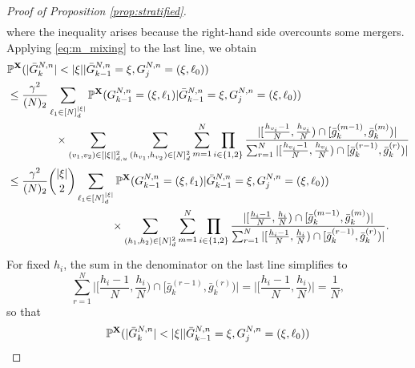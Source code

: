 \documentclass[a4paper,11pt]{article}
\theoremstyle{definition}
\newcommand{\bbP}{\mathbb{P}}
\newcommand{\bfX}{\mathbf{X}}
\begin{document}
\begin{proof}[Proof of Proposition \ref{prop:stratified}]
\begin{align*}
\end{align*}
where the inequality arises because the right-hand side overcounts some mergers.
Applying \eqref{eq:m_mixing} to the last line, we obtain
\begin{align}
&\bbP^{ \bfX }( | \bar{ G }_k^{ N, n } | < | \xi | | \bar{ G }_{ k - 1 }^{ N, n } = \xi, G_j^{ N, n } = ( \xi, \ell_0 ) ) \notag \\
&\leq \frac{ \gamma^2 }{ ( N )_2 } \sum_{ \ell_1 \in [ N ]_d^{ | \xi | } } \bbP^{ \bfX }( G_{ k - 1 }^{ N, n } = ( \xi, \ell_1 ) | \bar{ G }_{ k - 1 }^{ N, n } = \xi, G_j^{ N, n } = ( \xi, \ell_0 ) ) \notag \\
&\phantom{= \sum_{ \ell_1 \in [ N ]_d^{ | \xi | } } } \times \sum_{ ( v_1, v_2 ) \in [ | \xi | ]_{ d, u }^2 } \sum_{ ( h_{ v_1 }, h_{ v_2 } ) \in [ N ]_d^2 } \sum_{ m = 1 }^N \prod_{ i \in \{ 1, 2 \} } \frac{ | [ \frac{ h_{ v_i } - 1 }{ N }, \frac{ h_{ v_i } }{ N } ) \cap [ \bar{ g }_k^{ ( m - 1 ) }, \bar{ g }_k^{ ( m ) } ) | }{ \sum_{ r = 1 }^N | [ \frac{ h_{ v_i } - 1 }{ N }, \frac{ h_{ v_i } }{ N } ) \cap [ \bar{ g }_k^{ ( r - 1 ) }, \bar{ g }_k^{ ( r ) } ) | } \notag \\
&\leq \frac{ \gamma^2 }{ ( N )_2 } \binom{ | \xi | }{ 2 } \sum_{ \ell_1 \in [ N ]_d^{ | \xi | } } \bbP^{ \bfX }( G_{ k - 1 }^{ N, n } = ( \xi, \ell_1 ) | \bar{ G }_{ k - 1 }^{ N, n } = \xi, G_j^{ N, n } = ( \xi, \ell_0 ) ) \notag \\
&\phantom{\leq \frac{ \gamma^4 }{ ( N )_2 } \binom{ | \xi | }{ 2 } \sum_{ \ell_1 \in [ N ]_d^{ | \xi | } } } \times \sum_{ ( h_1, h_2 ) \in [ N ]_d^2 } \sum_{ m = 1 }^N \prod_{ i \in \{ 1, 2 \} } \frac{ | [ \frac{ h_i - 1 }{ N }, \frac{ h_i }{ N } ) \cap [ \bar{ g }_k^{ ( m - 1 ) }, \bar{ g }_k^{ ( m ) } ) | }{ \sum_{ r = 1 }^N | [ \frac{ h_i - 1 }{ N }, \frac{ h_i }{ N } ) \cap [ \bar{ g }_k^{ ( r - 1 ) }, \bar{ g }_k^{ ( r ) } ) | }. \label{sum_rearrangement}
\end{align}
For fixed $h_i$, the sum in the denominator on the last line simplifies to
\begin{equation}\label{eq:stratified_denominator}
\sum_{ r = 1 }^N  \Big| \Big[ \frac{ h_i - 1 }{ N }, \frac{ h_i }{ N } \Big) \cap [ \bar{ g }_k^{ ( r - 1 ) }, \bar{ g }_k^{ ( r ) } ) \Big| = \Big| \Big[ \frac{ h_i - 1 }{ N }, \frac{ h_i }{ N } \Big) \Big| = \frac{ 1 }{ N },
\end{equation}
so that
\begin{align}
&\bbP^{ \bfX }( | \bar{ G }_k^{ N, n } | < | \xi | | \bar{ G }_{ k - 1 }^{ N, n } = \xi, G_j^{ N, n } = ( \xi, \ell_0 ) ) \notag \\

\end{align}
\end{proof}
\end{document}
